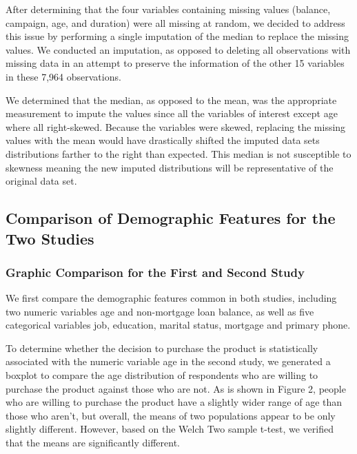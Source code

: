 \documentclass[]{article}
\begin{document}
After determining that the four variables containing missing values
(balance, campaign, age, and duration) were all missing at random, we
decided to address this issue by performing a single imputation of the
median to replace the missing values. We conducted an imputation, as
opposed to deleting all observations with missing data in an attempt to
preserve the information of the other 15 variables in these 7,964
observations.

We determined that the median, as opposed to the mean, was the
appropriate measurement to impute the values since all the variables of
interest except age where all right-skewed. Because the variables were
skewed, replacing the missing values with the mean would have
drastically shifted the imputed data sets distributions farther to the
right than expected. This median is not susceptible to skewness meaning
the new imputed distributions will be representative of the original
data set.

\newpage

\hypertarget{comparison-of-demographic-features-for-the-two-studies}{%
\subsection{Comparison of Demographic Features for the Two
Studies}\label{comparison-of-demographic-features-for-the-two-studies}}

\hypertarget{graphic-comparison-for-the-first-and-second-study}{%
\subsubsection{Graphic Comparison for the First and Second
Study}\label{graphic-comparison-for-the-first-and-second-study}}

We first compare the demographic features common in both studies,
including two numeric variables age and non-mortgage loan balance, as
well as five categorical variables job, education, marital status,
mortgage and primary phone.

To determine whether the decision to purchase the product is
statistically associated with the numeric variable age in the second
study, we generated a boxplot to compare the age distribution of
respondents who are willing to purchase the product against those who
are not. As is shown in Figure 2, people who are willing to purchase the
product have a slightly wider range of age than those who aren't, but
overall, the means of two populations appear to be only slightly
different. However, based on the Welch Two sample t-test, we verified
that the means are significantly different.
\end{document}
